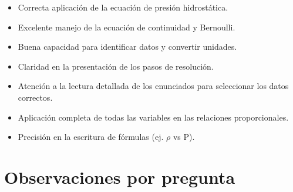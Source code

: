 \documentclass[11pt,a4paper]{article}
\begin{document}
\vspace{4pt}
\begin{minipage}[t]{0.48\linewidth}
  \begin{tcolorbox}[cajaFortaleza, title={Fortalezas}]
\begin{itemize}[leftmargin=1.5em, itemsep=2pt]
  \item Correcta aplicación de la ecuación de presión hidrostática.
  \item Excelente manejo de la ecuación de continuidad y Bernoulli.
  \item Buena capacidad para identificar datos y convertir unidades.
  \item Claridad en la presentación de los pasos de resolución.
\end{itemize}
  \end{tcolorbox}
\end{minipage}
\hfill
\begin{minipage}[t]{0.48\linewidth}
  \begin{tcolorbox}[cajaMejora, title={Areas de mejora}]
\begin{itemize}[leftmargin=1.5em, itemsep=2pt]
  \item Atención a la lectura detallada de los enunciados para seleccionar los datos correctos.
  \item Aplicación completa de todas las variables en las relaciones proporcionales.
  \item Precisión en la escritura de fórmulas (ej. $\rho$ vs P).
\end{itemize}
  \end{tcolorbox}
\end{minipage}

\section*{Observaciones por pregunta}
\end{document}
